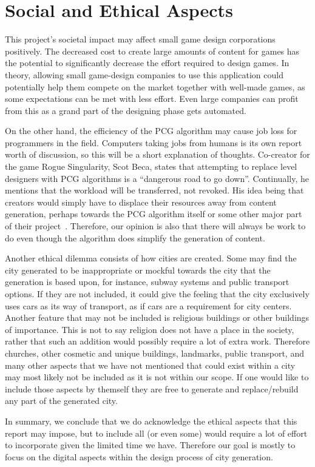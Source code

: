 \section{Social and Ethical Aspects}
This project's societal impact may affect small game design corporations positively.
The decreased cost to create large amounts of content for games has the potential to significantly decrease the effort required to design games.
In theory, allowing small game-design companies to use this application could potentially help them compete on the market together with well-made games, as some expectations can be met with less effort.
Even large companies can profit from this as a grand part of the designing phase gets automated.

On the other hand, the efficiency of the PCG algorithm may cause job loss for programmers in the field.
Computers taking jobs from humans is its own report worth of discussion, so this will be a short explanation of thoughts.
Co-creator for the game Rogue Singularity, Scot Beca, states that attempting to replace level designers with PCG algorithms is a ``dangerous road to go down''.
Continually, he mentions that the workload will be transferred, not revoked.
His idea being that creators would simply have to displace their resources away from content generation, perhaps towards the PCG algorithm itself or some other major part of their project~\cite{Gamasutra}.
Therefore, our opinion is also that there will always be work to do even though the algorithm does simplify the generation of content.

Another ethical dilemma consists of how cities are created.
Some may find the city generated to be inappropriate or mockful towards the city that the generation is based upon, for instance, subway systems and public transport options.
If they are not included, it could give the feeling that the city exclusively uses cars as its way of transport, as if cars are a requirement for city centers.
Another feature that may not be included is religious buildings or other buildings of importance.
This is not to say religion does not have a place in the society, rather that such an addition would possibly require a lot of extra work.
Therefore churches, other cosmetic and unique buildings, landmarks, public transport, and many other aspects that we have not mentioned that could exist within a city may most likely not be included as it is not within our scope.
If one would like to include those aspects by themself they are free to generate and replace/rebuild any part of the generated city.

In summary, we conclude that we do acknowledge the ethical aspects that this report may impose, but to include all (or even some) would require a lot of effort to incorporate given the limited time we have.
Therefore our goal is mostly to focus on the digital aspects within the design process of city generation.
